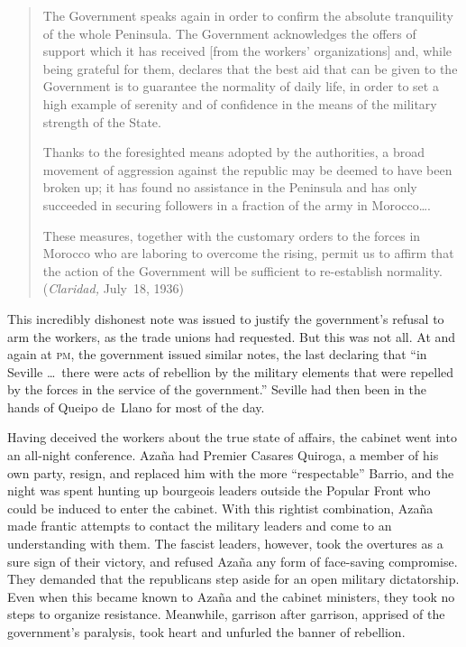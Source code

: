 \begin{quotation}
  \begin{sloppypar}
  The Government speaks again in order to confirm the absolute tranquility of the whole Peninsula. The Government acknowledges the offers of support which it has received [from the workers’ organizations] and, while being grateful for them, declares that the best aid that can be given to the Government is to guarantee the normality of daily life, in order to set a high example of serenity and of confidence in the means of the military strength of the State.
  \end{sloppypar}
  
  Thanks to the foresighted means adopted by the authorities, a broad movement of aggression against the republic may be deemed to have been broken up; it has found no assistance in the Peninsula and has only succeeded in securing followers in a fraction of the army in Morocco\dots.
  
  \indexClaridad
  These measures, together with the customary orders to the forces in Morocco who are laboring to overcome the rising, permit us to affirm that the action of the Government will be sufficient to re-establish normality. (\emph{Claridad,} July~18, 1936)
\end{quotation}

This incredibly dishonest note was issued to justify the government’s refusal to arm the workers, as the trade unions had requested. But this was not all. At  and again at  \textsc{pm}, the government issued similar notes, the last declaring that ``in Seville \dots\ there were acts of rebellion by the military elements that were repelled by the forces in the service of the government.'' Seville had then been in the hands of Queipo de~Llano for most of the day.

\indexMAzana\indexDBarrio{}
Having deceived the workers about the true state of affairs, the cabinet went into an all-night conference. Azaña had Premier Cas\-a\-res Quiroga, a member of his own party, resign, and replaced him with the more ``respectable'' Barrio, and the night was spent hunting up bourgeois leaders outside the Popular Front who could be induced to enter the cabinet. With this rightist combination, Azaña made frantic attempts to contact the military leaders and come to an understanding with them. The fascist leaders, however, took the overtures as a sure sign of their victory, and refused Azaña any form of face-saving compromise. They demanded that the republicans step aside for an open military dictatorship. Even when this became known to Azaña and the cabinet ministers, they took no steps to organize resistance. Meanwhile, garrison after garrison, apprised of the government’s paralysis, took heart and unfurled the banner of rebellion.

